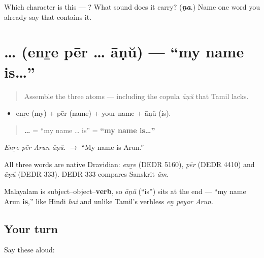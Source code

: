 \begin{tcolorbox}[breakable,colback=teal!4,colframe=teal!35!black,title={Before you move on}]
Which character is this — ? What sound does it carry? (\emph{\textbf{ṇa}}.) Name one word you already say that contains it.
\end{tcolorbox}
\section[\texorpdfstring{\ml{എന്റെ} \ml{പേര്} … \ml{ആണ്} (enṟe pēr … āṇŭ)}{എന്റെ പേര് … ആണ് (enṟe pēr … āṇŭ)}]{  …  (enṟe pēr … āṇŭ) — \textquotedblleft{}my name is…\textquotedblright{}}

\label{lesson:ML-C02-enre-peru-aanu}



\begin{quote}
Assemble the three atoms — including the copula \emph{āṇŭ} that Tamil lacks.
\end{quote}

\begin{cousinweb}
\begin{itemize}
\raggedright
  \item enṟe (my) + pēr (name) + your name + āṇŭ (is).
\end{itemize}

\begin{quote}
\textbf{  … } = \textquotedblleft{}my name … is\textquotedblright{} = \textbf{\textquotedblleft{}my name is…\textquotedblright{}}
\end{quote}

\emph{Enṟe pēr Arun āṇŭ.} $\to$ \textquotedblleft{}My name is Arun.\textquotedblright{}

All three words are native Dravidian: \emph{enṟe} (DEDR 5160), \emph{pēr} (DEDR 4410) and \emph{āṇŭ} (DEDR 333). DEDR 333 compares Sanskrit \emph{ām}.
\end{cousinweb}

\begin{grammarlens}[title={Grammar Lens: verb last}]
Malayalam is subject–object–\textbf{verb}, so \emph{āṇŭ} (\textquotedblleft{}is\textquotedblright{}) sits at the end — \textquotedblleft{}my name Arun \textbf{is},\textquotedblright{} like Hindi \emph{hai} and unlike Tamil's verbless \emph{eṉ peyar Arun}.
\end{grammarlens}

\subsection*{Your turn}
Say these aloud:

